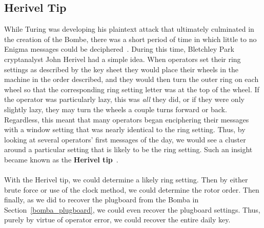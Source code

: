 \subsection{Herivel Tip}
While Turing was developing his plaintext attack that ultimately
culminated in the creation of the Bombe, there was a short period of time in which little to no Enigma
messages could be deciphered~\cite[p.~102]{Welchman1982HutSix}. During this time, Bletchley Park
cryptanalyst John Herivel had a simple idea. When operators set their
ring settings as described by the key sheet they would place their
wheels in the machine in the order described, and they would then
turn the outer ring on each wheel so that the corresponding ring
setting letter was at the top of the wheel. If the operator was
particularly lazy, this was \emph{all} they did, or if they were only
slightly lazy, they may turn the wheels a couple turns forward or
back. Regardless, this meant that many operators began enciphering
their messages with a window setting that was nearly identical to the
ring setting. Thus, by looking at several operators' first messages of
the day, we would see a cluster around a particular setting
that is likely to be the ring setting. Such an insight became known
as the {\bf{Herivel tip}}~\cite[p.~143]{BudianskyBattleOfWits2000}.
\\\\With the Herivel tip, we could determine a likely ring setting.
Then by either brute force or use of the clock method, we could
determine the rotor order. Then finally, as we did to recover the
plugboard from the Bomba in Section~\ref{bomba_plugboard}, we could
even recover the plugboard settings. Thus, purely by virtue of
operator error, we could recover the entire daily key.

